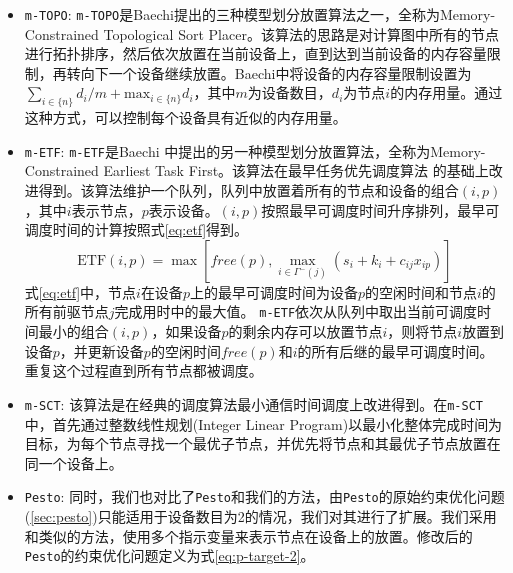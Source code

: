 \begin{itemize}
	\item \texttt{m-TOPO}: \texttt{m-TOPO}是Baechi提出的三种模型划分放置算法之一，全称为Memory-Constrained Topological Sort Placer。该算法的思路是对计算图中所有的节点进行拓扑排序，然后依次放置在当前设备上，直到达到当前设备的内存容量限制，再转向下一个设备继续放置。Baechi中将设备的内存容量限制设置为$\sum_{i\in\{n\}}d_i / m + \mathrm{max}_{i\in\{n\}} d_i$，其中$m$为设备数目，$d_i$为节点$i$的内存用量。通过这种方式，可以控制每个设备具有近似的内存用量。
	\item \texttt{m-ETF}: \texttt{m-ETF}是Baechi 中提出的另一种模型划分放置算法，全称为Memory-Constrained Earliest Task First。该算法在最早任务优先调度算法 的基础上改进得到。该算法维护一个队列，队列中放置着所有的节点和设备的组合$(i,p)$，其中$i$表示节点，$p$表示设备。$(i,p)$按照最早可调度时间升序排列，最早可调度时间的计算按照式\ref{eq:etf}得到。
	\begin{equation}
		\label{eq:etf}
		\mathrm{ETF}(i,p) = \max\left[\mathit{free(p)}, \max_{i\in \Gamma^- (j)}(s_i+k_i+c_{ij}x_{ip}) \right]
	\end{equation}
	式\ref{eq:etf}中，节点$i$在设备$p$上的最早可调度时间为设备$p$的空闲时间和节点$i$的所有前驱节点$j$完成用时中的最大值。
	\texttt{m-ETF}依次从队列中取出当前可调度时间最小的组合$(i,p)$，如果设备$p$的剩余内存可以放置节点$i$，则将节点$i$放置到设备$p$，并更新设备$p$的空闲时间$\mathit{free}(p)$和$i$的所有后继的最早可调度时间。重复这个过程直到所有节点都被调度。

	\item \texttt{m-SCT}: 该算法是在经典的调度算法最小通信时间调度上改进得到。在\texttt{m-SCT}中，首先通过整数线性规划(Integer Linear Program)以最小化整体完成时间为目标，为每个节点寻找一个最优子节点，并优先将节点和其最优子节点放置在同一个设备上。
	\item \texttt{Pesto}: 同时，我们也对比了\texttt{Pesto}和我们的方法，由\texttt{Pesto}的原始约束优化问题(\ref{sec:pesto})只能适用于设备数目为2的情况，我们对其进行了扩展。我们采用和\sys{}类似的方法，使用多个指示变量来表示节点在设备上的放置。修改后的\texttt{Pesto}的约束优化问题定义为式\ref{eq:p-target-2}。
\end{itemize}








